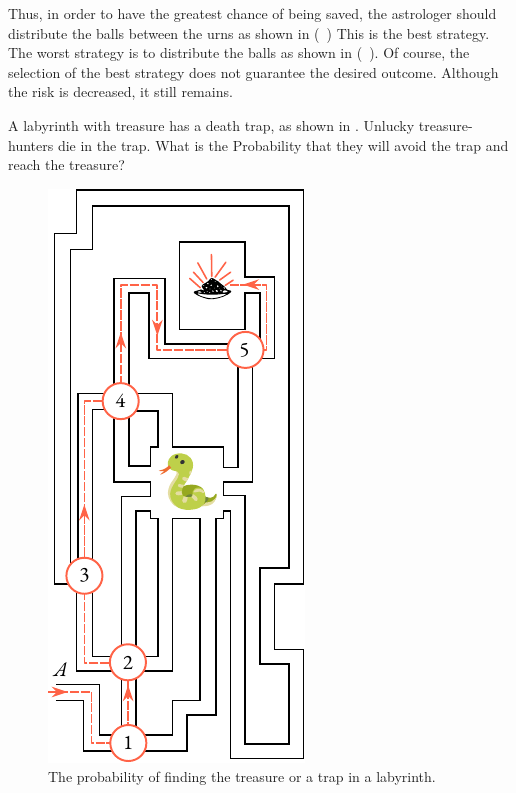 Thus, in order to have the greatest chance of being saved, the
astrologer should distribute the balls between the urns as shown in
(~) This is the best strategy. The worst
strategy is to distribute the balls as shown in (~). Of course, the selection of the best strategy does not guarantee the desired outcome. Although the risk is decreased, it still remains.

 A labyrinth with treasure has a
death trap, as shown in . Unlucky treasure-hunters
die in the trap. What is the Probability that they will avoid the trap
and reach the treasure?
\begin{figure}
 \centering
 \includegraphics[width=0.9\linewidth]{figures/labyrinth.pdf}
\caption{The probability of finding the treasure or a trap in a labyrinth.\label{labyrinth}}
 \end{figure}
 
